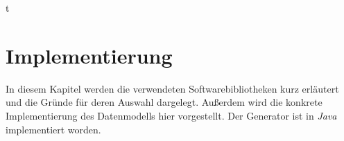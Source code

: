 t\chapter{Implementierung}
\label{chap:implementation}


In diesem Kapitel werden die verwendeten Softwarebibliotheken kurz erläutert und die Gründe für deren Auswahl dargelegt. Außerdem wird die konkrete Implementierung des Datenmodells hier vorgestellt. Der Generator ist in \emph{Java} implementiert worden.




